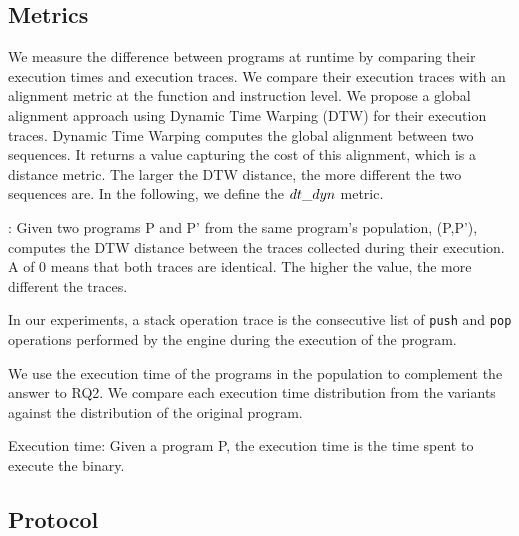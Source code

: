 \subsection*{Metrics}

We measure the difference between programs at runtime by comparing their execution times and execution traces. We compare their execution traces with an alignment metric at the function and instruction level. We propose a global alignment approach using Dynamic Time Warping (DTW) for their execution traces. %
Dynamic Time Warping \cite{Maia08usinga} computes the global alignment between two sequences. It returns a value capturing the cost of this alignment, which is a distance metric. The larger the DTW distance, the more different the two sequences are.
In the following, we define the $dt\_dyn$ metric. 
 

\begin{metric}{\DTW{}:}
\label{metric:stack}
	Given two programs P and P' from the same program's population, \DTW{}(P,P'), computes the DTW distance between the traces collected during their execution. \\
	A \DTW{} of $0$ means that both traces are identical.
	The higher the value, the more different the traces. 
\end{metric}



In our experiments, a stack operation trace is the consecutive list of \texttt{push} and \texttt{pop} operations performed by the \wasm engine during the execution of the program.

We use the execution time of the programs in the population to complement the answer to RQ2. We compare each execution time distribution from the variants against the distribution of the original program.

\begin{metric}{Execution time:}\label{metric:time}
	Given a \wasm program P, the execution time is the time spent to execute the binary.
\end{metric}


\subsection*{Protocol}

